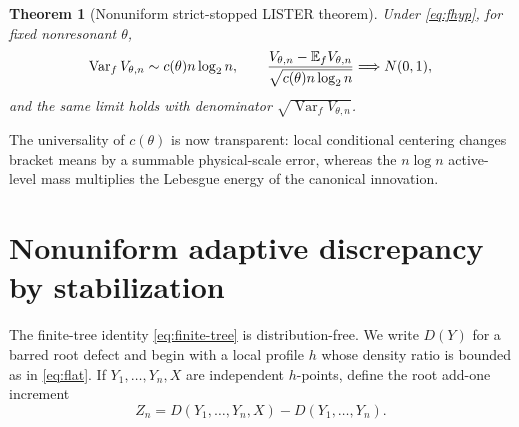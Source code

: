 \documentclass[11pt]{article}
\numberwithin{equation}{section}
\newtheorem{theorem}{Theorem}[section]
\theoremstyle{definition}\newtheorem{definition}[theorem]{Definition}
\theoremstyle{remark}\newtheorem{remark}[theorem]{Remark}
\newcommand{\E}{\mathbb E}\newcommand{\Pp}{\mathbb P}
\newcommand{\Var}{\operatorname {Var}}\newcommand{\Cov}{\operatorname {Cov}}
\newcommand{\1}{\mathbf 1}\newcommand{\cD}{\mathcal D}
\begin{document}
\begin{theorem}[Nonuniform strict-stopped LISTER theorem]\label{thm:nonunifV}
Under \eqref{eq:fhyp}, for fixed nonresonant $\theta$,
\begin{equation}
 \Var_fV_{\theta,n}\sim c(\theta)n\log_2n,\qquad
 {V_{\theta,n}-\E_fV_{\theta,n}\over\sqrt{c(\theta)n\log_2n}}
 \Longrightarrow N(0,1),                                  \label{eq:Vnonuniform}
\end{equation}
and the same limit holds with denominator $\sqrt{\Var_fV_{\theta,n}}$.
\end{theorem}
The universality of $c(\theta)$ is now transparent: local conditional
centering changes bracket means by a summable physical-scale error, whereas
the $n\log n$ active-level mass multiplies the Lebesgue energy of the
canonical innovation.

\clearpage
\section{Nonuniform adaptive discrepancy by stabilization}\label{sec:stabilization}
The finite-tree identity \eqref{eq:finite-tree} is distribution-free.  We
write $D(Y)$ for a barred root defect and begin with a local profile $h$
whose density ratio is bounded as in \eqref{eq:flat}.  If $Y_1,\ldots,Y_n,X$
are independent $h$-points, define the root add-one increment
\begin{equation}Z_n=D(Y_1,\ldots,Y_n,X)-D(Y_1,\ldots,Y_n). \label{eq:Zn}
\end{equation}
\end{document}
